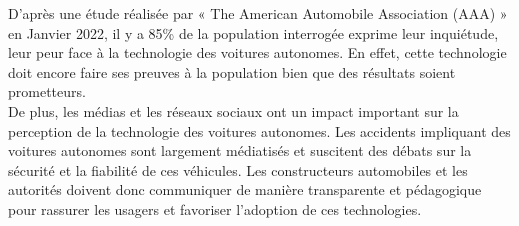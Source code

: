 D'après une étude réalisée par « The American Automobile Association (AAA) »\cite{consumer_skepticim} en Janvier 2022, il y a 85\% de la population interrogée exprime leur inquiétude, leur peur face à la technologie des voitures autonomes. En effet, cette technologie doit encore faire ses preuves à la population bien que des résultats soient prometteurs.\\
De plus, les médias et les réseaux sociaux ont un impact important sur la perception de la technologie des voitures autonomes. Les accidents impliquant des voitures autonomes sont largement médiatisés et suscitent des débats sur la sécurité et la fiabilité de ces véhicules. Les constructeurs automobiles et les autorités doivent donc communiquer de manière transparente et pédagogique pour rassurer les usagers et favoriser l’adoption de ces technologies.\\
\vspace{0.5cm}

